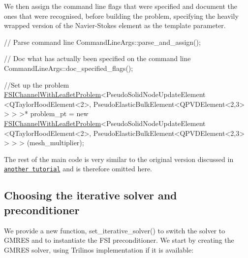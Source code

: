 We then assign the command line flags that were specified and document the ones that were recognised, before building the problem, specifying the heavily wrapped version of the {\ttfamily Navier-\/\+Stokes} element as the template parameter.


\begin{DoxyCodeInclude}
 \textcolor{comment}{// Parse command line}
 CommandLineArgs::parse\_and\_assign(); 
 
 \textcolor{comment}{// Doc what has actually been specified on the command line}
 CommandLineArgs::doc\_specified\_flags();

 \textcolor{comment}{//Set up the problem}
 \hyperlink{classFSIChannelWithLeafletProblem}{FSIChannelWithLeafletProblem}<PseudoSolidNodeUpdateElement
                              <QTaylorHoodElement<2>,
                               PseudoElasticBulkElement<QPVDElement<2,3> > > >* 
  problem\_pt = \textcolor{keyword}{new}  
  \hyperlink{classFSIChannelWithLeafletProblem}{FSIChannelWithLeafletProblem}<PseudoSolidNodeUpdateElement
                               <QTaylorHoodElement<2>,
                                PseudoElasticBulkElement<QPVDElement<2,3> > > >
  (mesh\_multiplier);

\end{DoxyCodeInclude}


The rest of the main code is very similar to the original version discussed in \href{../../../interaction/fsi_channel_with_leaflet/html/index.html}{\tt another tutorial} and is therefore omitted here.



\hypertarget{index_it_solve}{}\subsection{Choosing the iterative solver and preconditioner}\label{index_it_solve}
We provide a new function, {\ttfamily set\+\_\+iterative\+\_\+solver()} to switch the solver to G\+M\+R\+ES and to instantiate the F\+SI preconditioner. We start by creating the G\+M\+R\+ES solver, using Trilinos\textquotesingle{} implementation if it is available\+:

